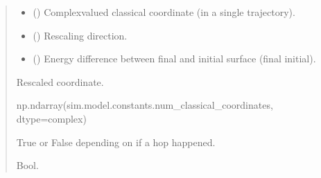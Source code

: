 \documentclass[letterpaper,10pt,english]{sphinxmanual}
\begin{document}
\begin{fulllineitems}
\label{\detokenize{user_guide/defaults:sim.model.hop_function}}
\pysigstartsignatures
\pysiglinewithargsret
{}
{\sphinxparamcomma {}\sphinxparamcomma {}\sphinxparamcomma {}\sphinxparamcomma {}\sphinxparamcomma {}}
{}
\pysigstopsignatures\begin{quote}\begin{description}
\begin{itemize}
\item {} 
\sphinxAtStartPar
{} (\sphinxstyleliteralemphasis{\sphinxupquote{(}}\sphinxstyleliteralemphasis{\sphinxupquote{, }}\sphinxstyleliteralemphasis{\sphinxupquote{)}}) \textendash{} Complex\sphinxhyphen{}valued classical coordinate (in a single trajectory).

\item {} 
\sphinxAtStartPar
{} (\sphinxstyleliteralemphasis{\sphinxupquote{(}}\sphinxstyleliteralemphasis{\sphinxupquote{, }}\sphinxstyleliteralemphasis{\sphinxupquote{)}}) \textendash{} Rescaling direction.

\item {} 
\sphinxAtStartPar
{} () \textendash{} Energy difference between final and initial surface (final \sphinxhyphen{} initial).

\end{itemize}

\sphinxAtStartPar
Rescaled coordinate.

\sphinxAtStartPar
np.ndarray(sim.model.constants.num\_classical\_coordinates, dtype=complex)

\sphinxAtStartPar
True or False depending on if a hop happened.

\sphinxAtStartPar
Bool.

\end{description}\end{quote}

\end{fulllineitems}
\end{document}
